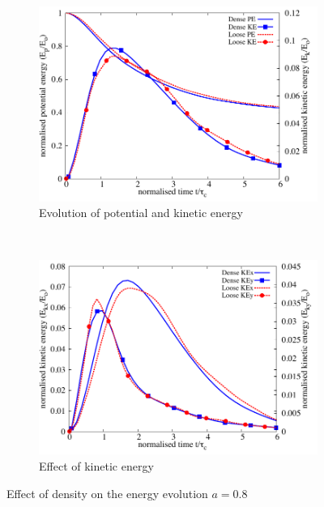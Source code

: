 \begin{figure}[tbhp]
\centering
\begin{subfigure}[b]{0.75\textwidth}
\centering
\includegraphics[width=\textwidth]{Energy_dense_r18}
\caption{Evolution of potential and kinetic energy}
\label{fig:Energy_dense_r18}
\end{subfigure}
\\
\begin{subfigure}[b]{0.75\textwidth}
\centering
\includegraphics[width=\textwidth]{KExy_dense_r18}
\caption{Effect of kinetic energy}
\label{fig:KExy_dense_r18}
\end{subfigure}
\caption{Effect of density on the energy evolution $a = 0.8$}
\label{fig:Energy_density_r18}
\end{figure}

